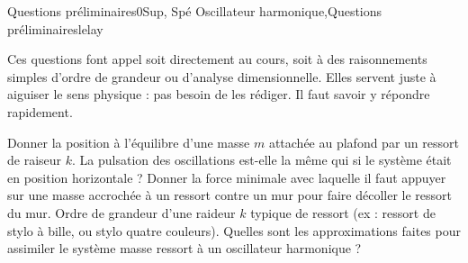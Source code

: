 
\begin{exercise}{Questions préliminaires}{0}{Sup, Spé}
{Oscillateur harmonique,Questions préliminaires}{lelay}

Ces questions font appel soit directement au cours, soit à des raisonnements simples d'ordre de grandeur ou d'analyse dimensionnelle. Elles servent juste à aiguiser le sens physique : pas besoin de les rédiger. Il faut savoir y répondre rapidement.

\begin{questions}
    \question Donner la position à l'équilibre d'une masse $m$ attachée au plafond par un ressort de raiseur $k$. La pulsation des oscillations est-elle la même qui si le système était en position horizontale ?
    \question Donner la force minimale avec laquelle il faut appuyer sur une masse accrochée à un ressort contre un mur pour faire décoller le ressort du mur.
    \question Ordre de grandeur d'une raideur $k$ typique de ressort (ex : ressort de stylo à bille, ou stylo quatre couleurs).
    \question Quelles sont les approximations faites pour assimiler le système masse ressort à un oscillateur harmonique ?
\end{questions}
\end{exercise}